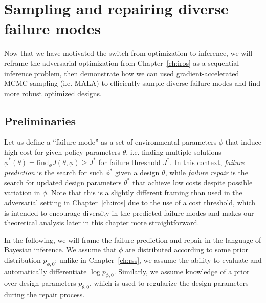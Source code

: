 

\section{Sampling and repairing diverse failure modes}

Now that we have motivated the switch from optimization to inference, we will reframe the adversarial optimization from Chapter~\ref{ch:iros} as a sequential inference problem, then demonstrate how we can used gradient-accelerated MCMC sampling (i.e. MALA) to efficiently sample diverse failure modes and find more robust optimized designs.

\subsection{Preliminaries}

Let us define a ``failure mode'' as a set of environmental parameters $\phi$ that induce high cost for given policy parameters $\theta$, i.e. finding multiple solutions $\phi^*(\theta) = \text{find}_\phi J(\theta, \phi) \geq J^*$ for failure threshold $J^*$. In this context, \textit{failure prediction} is the search for such $\phi^*$ given a design $\theta$, while \textit{failure repair} is the search for updated design parameters $\theta^*$ that achieve low costs despite possible variation in $\phi$. Note that this is a slightly different framing than used in the adversarial setting in Chapter~\ref{ch:iros} due to the use of a cost threshold, which is intended to encourage diversity in the predicted failure modes and makes our theoretical analysis later in this chapter more straightforward.

In the following, we will frame the failure prediction and repair in the language of Bayesian inference. We assume that $\phi$ are distributed according to some prior distribution $p_{\phi, 0}$; unlike in Chapter~\ref{ch:rss}, we assume the ability to evaluate and automatically differentiate $\log p_{\phi, 0}$. Similarly, we assume knowledge of a prior over design parameters $p_{\theta, 0}$, which is used to regularize the design parameters during the repair process.

